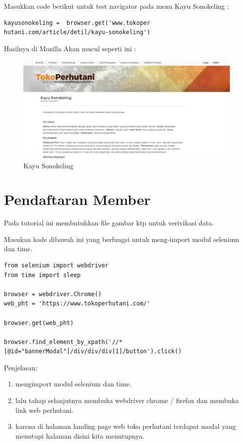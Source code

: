 Masukkan code berikut untuk test navigator pada menu Kayu Sonokeling :
\begin{verbatim}
kayusonokeling =  browser.get('www.tokoper
hutani.com/article/detil/kayu-sonokeling')
\end{verbatim}

Hasilnya  di Mozilla Akan mucul seperti ini :
\begin{figure}[h]
	\centering
	\includegraphics[scale=0.25]{figures/j3}
	\caption{Kayu Sonokeling}
\end{figure}

\newpage
\section{Pendaftaran Member}
Pada tutorial ini membutuhkan file gambar ktp untuk verivikasi data.

Masukan kode dibawah ini yang berfungsi untuk meng-import modul selenium dan time.
\begin{verbatim}
from selenium import webdriver
from time import sleep

browser = webdriver.Chrome()
web_pht = 'https://www.tokoperhutani.com/'

browser.get(web_pht)

browser.find_element_by_xpath('//*[@id="bannerModal"]/div/div/div[1]/button').click()

\end{verbatim}

Penjelasan:
\begin{enumerate}
	\item mengimport modul selenium dan time.
	\item lalu tahap selanjutnya membuka webdriver chrome / firefox dan membuka link web perhutani.
	\item karena di halaman landing page web toko perhutani terdapat modal yang menutupi halaman disini kita menutupnya.
\end{enumerate}


